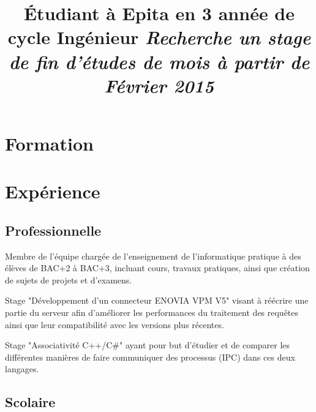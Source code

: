 \documentclass[10pt,a4paper]{../lib/moderncv/moderncv}
\title{\'{E}tudiant à Epita en 3\up{ème} année\newline
de cycle Ingénieur\newline
\textit{\Large Recherche un stage de fin d'études de\newline
6 mois à partir de Février 2015}}
\begin{document}
\makecvtitle

\section{Formation}




 {}

\section{Expérience}

\subsection{Professionnelle}

{Membre de l'équipe chargée de l'enseignement de l'informatique pratique à des
élèves de BAC+2 à BAC+3, incluant cours, travaux pratiques, ainsi que création
de sujets de projets et d'examens.}

{Stage "Développement d'un connecteur ENOVIA VPM V5" visant à réécrire une
partie du serveur afin d'améliorer les performances du traitement des requêtes
ainsi que leur compatibilité avec les versions plus récentes.}

{Stage "Associativité C++/C\#" ayant pour but d'étudier et de comparer les
différentes manières de faire communiquer des processus (IPC) dans ces deux
langages.}

\subsection{Scolaire}


\end{document}
